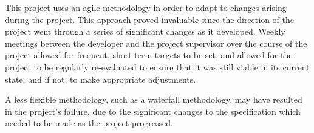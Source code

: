 


This project uses an agile methodology in order to adapt to changes arising during the project. This approach proved invaluable since the direction of the project went through a series of significant changes as it developed. Weekly meetings between the developer and the project supervisor over the course of the project allowed for frequent, short term targets to be set, and allowed for the project to be regularly re-evaluated to ensure that it was still viable in its current state, and if not, to make appropriate adjustments.

A less flexible methodology, such as a waterfall methodology, may have resulted in the project's failure, due to the significant changes to the specification which needed to be made as the project progressed.


